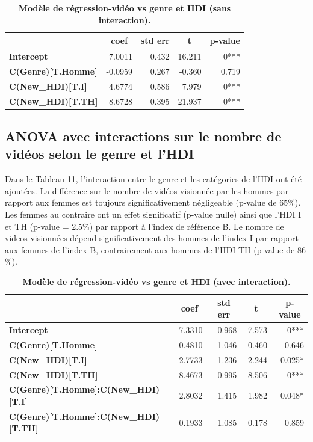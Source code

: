 \documentclass[12pt, a4paper, titlepage, table]{article}
\begin{document}
	\begin{table}[H]
		\centering
		\fontsize{12}{20}\selectfont
		\begin{tabular}{|l|r|r|r|r|}
			\hline
			\multicolumn{1}{|c|}{\textbf{}}&
			\multicolumn{1}{c|}{\textbf{coef}}&
			\multicolumn{1}{c|}{\textbf{std err}}&
			\multicolumn{1}{c|}{\textbf{t}}&
			\multicolumn{1}{c|}{\textbf{p-value}}\\	
			\hline
			\textbf{Intercept}&			7.0011&		0.432&	16.211&	0***\\	
			\textbf{C(Genre)[T.Homme]}&	-0.0959&	0.267&	-0.360&	0.719\\
			\textbf{C(New\_HDI)[T.I]}&	4.6774&		0.586&	7.979&	0***\\
			\textbf{C(New\_HDI)[T.TH]}&	8.6728&		0.395&	21.937&	0***\\
			\hline
		\end{tabular}
		\caption{\textbf{Modèle de régression-vidéo vs genre et HDI (sans interaction).}}
	\end{table}	

	\subsection{ANOVA avec interactions sur le nombre de vidéos selon le genre et l'HDI}	
	Dans le Tableau 11, l'interaction entre le genre et les catégories de l'HDI ont été ajoutées. La différence sur le nombre de vidéos visionnée par les hommes  par rapport aux femmes est toujours significativement négligeable (p-value de 65\%). Les femmes au contraire ont un effet significatif (p-value nulle) ainsi que l'HDI I et TH (p-value = 2.5\%) par rapport à l'index de référence B. Le nombre de videos visionnées dépend significativement des hommes de l'index I par rapport aux femmes de l'index B, contrairement aux hommes de l'HDI TH (p-value de 86 \%). 
	
	\begin{table}[H]
		\centering
		\fontsize{12}{20}\selectfont
		\begin{tabular}{|l|r|r|r|r|}
			\hline
			\multicolumn{1}{|c|}{\textbf{}}&
			\multicolumn{1}{c|}{\textbf{coef}}&
			\multicolumn{1}{c|}{\textbf{std err}}&
			\multicolumn{1}{c|}{\textbf{t}}&
			\multicolumn{1}{c|}{\textbf{p-value}}\\	
			\hline
				\textbf{Intercept}&			7.3310&			0.968&	7.573&	0***\\
				\textbf{C(Genre)[T.Homme]}&	-0.4810&		1.046&	-0.460&	0.646\\	
				\textbf{C(New\_HDI)[T.I]}&	2.7733&			1.236&	2.244&	0.025*\\	
				\textbf{C(New\_HDI)[T.TH]}&	8.4673&			0.995&	8.506&	0***\\	
				\textbf{C(Genre)[T.Homme]:C(New\_HDI)[T.I]}&	2.8032&	1.415&	1.982&	0.048*\\
				\textbf{C(Genre)[T.Homme]:C(New\_HDI)[T.TH]}&	0.1933&	1.085&	0.178&	0.859\\
			\hline
		\end{tabular}
	\caption{\textbf{Modèle de régression-vidéo vs genre et HDI (avec interaction).}}
\end{table}
	
\end{document}
